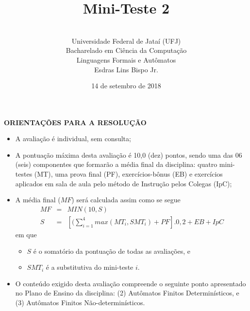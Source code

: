 \documentclass[12pt,a4paper,oneside]{article}
\author{\\Universidade Federal de Jataí (UFJ)\\Bacharelado em Ciência da Computação \\Linguagens Formais e Autômatos \\Esdras Lins Bispo Jr.}
\date{14 de setembro de 2018}
\title{\sc \huge Mini-Teste 2}
\begin{document}
\maketitle

{\bf ORIENTAÇÕES PARA A RESOLUÇÃO}

\small
 
\begin{itemize}
	\item A avaliação é individual, sem consulta;
	\item A pontuação máxima desta avaliação é 10,0 (dez) pontos, sendo uma das 06 (seis) componentes que formarão a média final da disciplina: quatro mini-testes (MT), uma prova final (PF), exercícios-bônus (EB) e exercícios aplicados em sala de aula pelo método de Instrução pelos Colegas (IpC);
	\item A média final ($MF$) será calculada assim como se segue
	\begin{eqnarray}
		MF & = & MIN(10, S) \nonumber \\
		S & = & [(\sum_{i=1}^{4} max(MT_i, SMT_i ) + PF].0,2  + EB + IpC\nonumber
	\end{eqnarray}
	em que 
	\begin{itemize}
		\item $S$ é o somatório da pontuação de todas as avaliações, e
		\item $SMT_i$ é a substitutiva do mini-teste $i$.
	\end{itemize}
	\item O conteúdo exigido desta avaliação compreende o seguinte ponto apresentado no Plano de Ensino da disciplina: (2) Autômatos Finitos Determinísticos, e (3) Autômatos Finitos Não-determinísticos.
\end{itemize}

\begin{center}
\end{center}

\newpage
\end{document}
